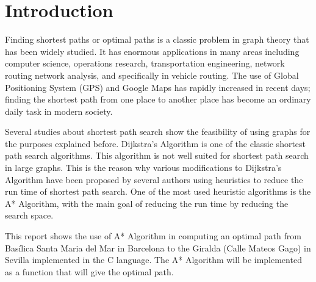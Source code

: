 \section{Introduction}

Finding shortest paths or optimal paths is a classic problem in graph theory that has been widely studied. It has enormous applications in many areas including computer science, operations research, transportation engineering, network routing network analysis, and specifically in vehicle routing. The use of Global Positioning System (GPS) and Google Maps has rapidly increased in recent days; finding the shortest path from one place to another place has become an ordinary daily task in modern society.

Several studies about shortest path search show the feasibility of using graphs for the purposes explained before. Dijkstra's Algorithm is one of the classic shortest path search algorithms. This algorithm is not well suited for shortest path search in large graphs. This is the reason why various modifications to Dijkstra's Algorithm have been proposed by several authors using heuristics to reduce the run time of shortest path search. One of the most used heuristic algorithms is the A* Algorithm, with the main goal of reducing the run time by reducing the search space.

This report shows the use of A* Algorithm in computing an optimal path from Basílica Santa Maria del Mar in Barcelona to the Giralda (Calle Mateos Gago) in Sevilla implemented in the C language. The A* Algorithm will be implemented as a function that will give the optimal path.



